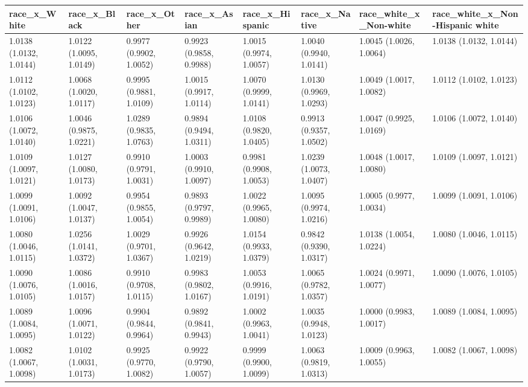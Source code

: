 \begin{table}[ht]
\centering
\begin{tabular}{llllllll}
  \hline
race_x_White & race_x_Black & race_x_Other & race_x_Asian & race_x_Hispanic & race_x_Native & race_white_x_Non-white & race_white_x_Non-Hispanic white \\ 
  \hline
1.0138 (1.0132, 1.0144) & 1.0122 (1.0095, 1.0149) & 0.9977 (0.9902, 1.0052) & 0.9923 (0.9858, 0.9988) & 1.0015 (0.9974, 1.0057) & 1.0040 (0.9940, 1.0141) & 1.0045 (1.0026, 1.0064) & 1.0138 (1.0132, 1.0144) \\ 
  1.0112 (1.0102, 1.0123) & 1.0068 (1.0020, 1.0117) & 0.9995 (0.9881, 1.0109) & 1.0015 (0.9917, 1.0114) & 1.0070 (0.9999, 1.0141) & 1.0130 (0.9969, 1.0293) & 1.0049 (1.0017, 1.0082) & 1.0112 (1.0102, 1.0123) \\ 
  1.0106 (1.0072, 1.0140) & 1.0046 (0.9875, 1.0221) & 1.0289 (0.9835, 1.0763) & 0.9894 (0.9494, 1.0311) & 1.0108 (0.9820, 1.0405) & 0.9913 (0.9357, 1.0502) & 1.0047 (0.9925, 1.0169) & 1.0106 (1.0072, 1.0140) \\ 
  1.0109 (1.0097, 1.0121) & 1.0127 (1.0080, 1.0173) & 0.9910 (0.9791, 1.0031) & 1.0003 (0.9910, 1.0097) & 0.9981 (0.9908, 1.0053) & 1.0239 (1.0073, 1.0407) & 1.0048 (1.0017, 1.0080) & 1.0109 (1.0097, 1.0121) \\ 
  1.0099 (1.0091, 1.0106) & 1.0092 (1.0047, 1.0137) & 0.9954 (0.9855, 1.0054) & 0.9893 (0.9797, 0.9989) & 1.0022 (0.9965, 1.0080) & 1.0095 (0.9974, 1.0216) & 1.0005 (0.9977, 1.0034) & 1.0099 (1.0091, 1.0106) \\ 
  1.0080 (1.0046, 1.0115) & 1.0256 (1.0141, 1.0372) & 1.0029 (0.9701, 1.0367) & 0.9926 (0.9642, 1.0219) & 1.0154 (0.9933, 1.0379) & 0.9842 (0.9390, 1.0317) & 1.0138 (1.0054, 1.0224) & 1.0080 (1.0046, 1.0115) \\ 
  1.0090 (1.0076, 1.0105) & 1.0086 (1.0016, 1.0157) & 0.9910 (0.9708, 1.0115) & 0.9983 (0.9802, 1.0167) & 1.0053 (0.9916, 1.0191) & 1.0065 (0.9782, 1.0357) & 1.0024 (0.9971, 1.0077) & 1.0090 (1.0076, 1.0105) \\ 
  1.0089 (1.0084, 1.0095) & 1.0096 (1.0071, 1.0122) & 0.9904 (0.9844, 0.9964) & 0.9892 (0.9841, 0.9943) & 1.0002 (0.9963, 1.0041) & 1.0035 (0.9948, 1.0123) & 1.0000 (0.9983, 1.0017) & 1.0089 (1.0084, 1.0095) \\ 
  1.0082 (1.0067, 1.0098) & 1.0102 (1.0031, 1.0173) & 0.9925 (0.9770, 1.0082) & 0.9922 (0.9790, 1.0057) & 0.9999 (0.9900, 1.0099) & 1.0063 (0.9819, 1.0313) & 1.0009 (0.9963, 1.0055) & 1.0082 (1.0067, 1.0098) \\ 

\end{tabular}
\end{table}
